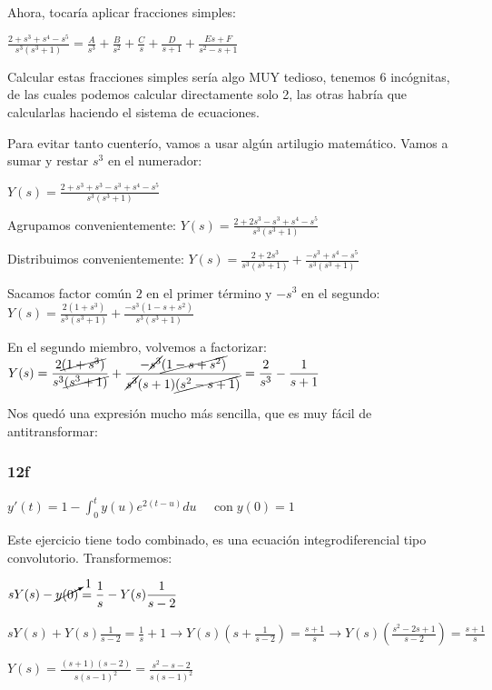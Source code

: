 \documentclass[11pt]{article}
\begin{document}
	Ahora, tocaría aplicar fracciones simples:
	
	$\displaystyle \frac{2+s^3+s^4-s^5}{s^3(s^3+1)}=\frac{A}{s^3}+\frac{B}{s^2}+\frac{C}{s}+\frac{D}{s+1}+\frac{Es+F}{s^2-s+1}$
	
	Calcular estas fracciones simples sería algo MUY tedioso, tenemos 6 incógnitas, de las cuales podemos calcular directamente solo 2, las otras habría que calcularlas haciendo el sistema de ecuaciones.
	
	Para evitar tanto cuenterío, vamos a usar algún artilugio matemático. Vamos a sumar y restar $s^3$ en el numerador:
	
	$\displaystyle Y(s)=\frac{2+s^3+s^3-s^3+s^4-s^5}{s^3(s^3+1)}$
	
	Agrupamos convenientemente: $\displaystyle Y(s)=\frac{2+2s^3-s^3+s^4-s^5}{s^3(s^3+1)}$
	
	Distribuimos convenientemente: $\displaystyle Y(s)=\frac{2+2s^3}{s^3(s^3+1)}+\frac{-s^3+s^4-s^5}{s^3(s^3+1)}$
	
	Sacamos factor común $2$ en el primer término y $-s^3$ en el segundo:\\$\displaystyle Y(s)=\frac{2(1+s^3)}{s^3(s^3+1)}+\frac{-s^3(1-s+s^2)}{s^3(s^3+1)}$
	
	En el segundo miembro, volvemos a factorizar:\\
	$\displaystyle Y(s)=\frac{2\cancel{(1+s^3)}}{s^3\cancel{(s^3+1)}}+\frac{-\cancel{s^3}\cancel{(1-s+s^2)}}{\cancel{s^3}(s+1)\cancel{(s^2-s+1)}}=\frac{2}{s^3}-\frac{1}{s+1}$
	
	Nos quedó una expresión mucho más sencilla, que es muy fácil de antitransformar:
	
	
	\subsubsection{12f}
	$\displaystyle y'(t)=1-\int_{0}^{t}y(u)e^{2(t-u)}du \;\;\;\;\; \mathrm{con}\; y(0)=1$
	
	Este ejercicio tiene todo combinado, es una ecuación integrodiferencial tipo convolutorio. Transformemos:
	
	$\displaystyle sY(s)-\cancelto{1}{y(0)}=\frac{1}{s} - Y(s) \frac{1}{s-2}$
	
	$\displaystyle sY(s)+Y(s) \frac{1}{s-2}=\frac{1}{s} + 1 \rightarrow Y(s)\left(s + \frac{1}{s-2}\right)=\frac{s+1}{s} \rightarrow Y(s)\left(\frac{s^2-2s+1}{s-2}\right) =\frac{s+1}{s}$
	
	$\displaystyle Y(s)=\frac{(s+1)(s-2)}{s(s-1)^2}=\frac{s^2-s-2}{s(s-1)^2}$
	
\end{document}
